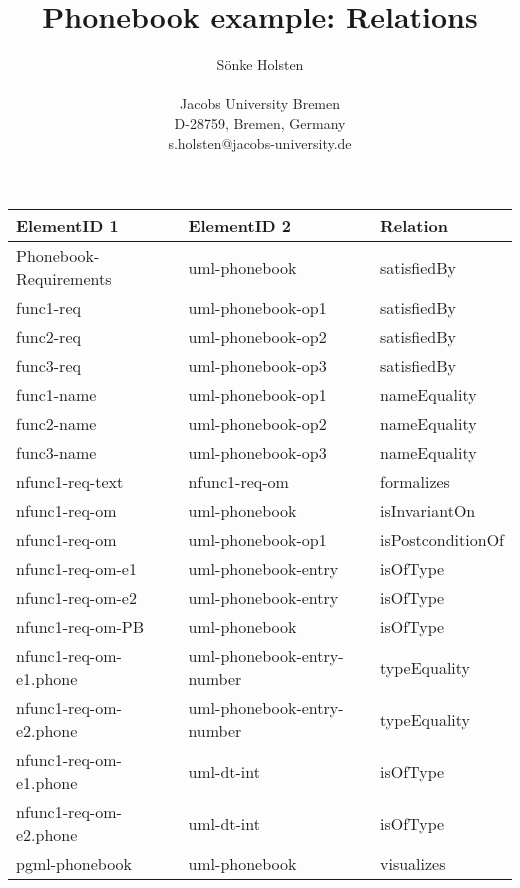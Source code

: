 \documentclass[pdftex,a4paper]{article}
\title{Phonebook example: Relations}
\author{S{\"o}nke Holsten\\[1ex]
\begin{minipage}{.5\textwidth}
  \centering
  Jacobs University Bremen \\
  D-28759, Bremen, Germany\\
  s.holsten@jacobs-university.de
\end{minipage}}
\begin{document}
\maketitle{}

\begin{tabular}{|l|l|l|}
\hline
ElementID 1 & ElementID 2 & Relation \\
\hline
Phonebook-Requirements & uml-phonebook & satisfiedBy \\ \hline
func1-req & uml-phonebook-op1 & satisfiedBy \\ \hline
func2-req & uml-phonebook-op2 & satisfiedBy \\ \hline
func3-req & uml-phonebook-op3 & satisfiedBy \\ \hline
func1-name & uml-phonebook-op1 & nameEquality \\ \hline
func2-name & uml-phonebook-op2 & nameEquality \\ \hline
func3-name & uml-phonebook-op3 & nameEquality \\ \hline
nfunc1-req-text & nfunc1-req-om & formalizes \\ \hline
nfunc1-req-om & uml-phonebook & isInvariantOn \\ \hline
nfunc1-req-om & uml-phonebook-op1 & isPostconditionOf \\ \hline
nfunc1-req-om-e1 & uml-phonebook-entry & isOfType \\ \hline
nfunc1-req-om-e2 & uml-phonebook-entry & isOfType \\ \hline
nfunc1-req-om-PB & uml-phonebook & isOfType \\ \hline
nfunc1-req-om-e1.phone & uml-phonebook-entry-number & typeEquality \\ \hline
nfunc1-req-om-e2.phone & uml-phonebook-entry-number & typeEquality \\ \hline
nfunc1-req-om-e1.phone & uml-dt-int & isOfType \\ \hline
nfunc1-req-om-e2.phone & uml-dt-int & isOfType \\ \hline
pgml-phonebook & uml-phonebook & visualizes \\ \hline
\end{tabular}
\end{document}
